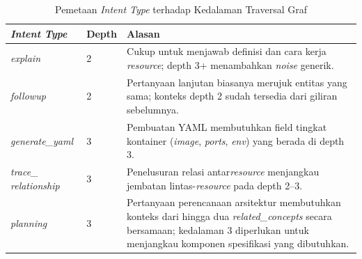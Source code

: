﻿\renewcommand{\arraystretch}{1.3}
\captionsetup[table]{justification=raggedright,singlelinecheck=false}
\begin{table}[H]
\caption{Pemetaan \textit{Intent Type} terhadap Kedalaman Traversal Graf}
\label{tbl:intent_depth_iv}
\centering
\begin{tabular}{|p{}|p{}|p{}|}
\hline
\textbf{\textit{Intent Type}} & \textbf{Depth} & \textbf{Alasan} \\
\hline
\textit{explain} & 2 & Cukup untuk menjawab definisi dan cara kerja \textit{resource}; depth 3+ menambahkan \textit{noise} generik. \\
\hline
\textit{followup} & 2 & Pertanyaan lanjutan biasanya merujuk entitas yang sama; konteks depth 2 sudah tersedia dari giliran sebelumnya. \\
\hline
\textit{generate\_yaml} & 3 & Pembuatan YAML membutuhkan field tingkat kontainer (\textit{image}, \textit{ports}, \textit{env}) yang berada di depth 3. \\
\hline
\textit{trace\_ relationship} & 3 & Penelusuran relasi antar\textit{resource} menjangkau jembatan lintas-\textit{resource} pada depth 2--3. \\
\hline
\textit{planning} & 3 & Pertanyaan perencanaan arsitektur membutuhkan konteks dari hingga dua \textit{related\_concepts} secara bersamaan; kedalaman 3 diperlukan untuk menjangkau komponen spesifikasi yang dibutuhkan. \\
\hline
\end{tabular}
\end{table}
